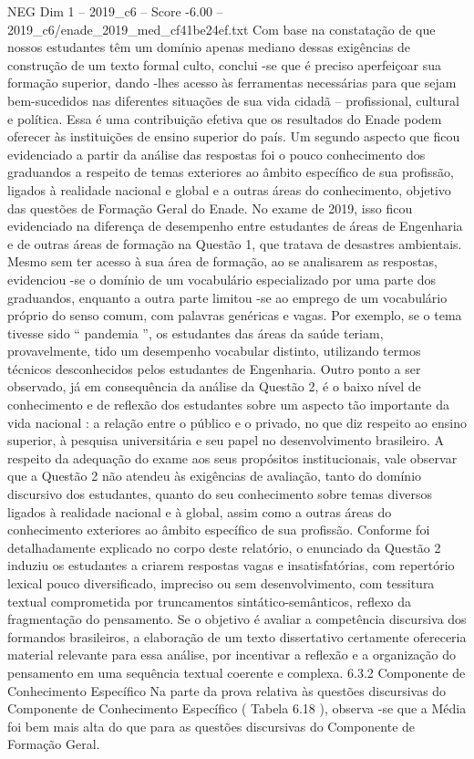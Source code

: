 \begin{textsample}{NEG Dim 1 – 2019\_c6 – Score -6.00 – 2019\_c6/enade\_2019\_med\_cf41be24ef.txt}
Com base na constatação de que nossos estudantes têm um domínio apenas mediano dessas exigências de construção de um texto formal culto, conclui -se que é preciso aperfeiçoar sua formação superior, dando -lhes acesso às ferramentas necessárias para que sejam bem-sucedidos nas diferentes situações de sua vida cidadã – profissional, cultural e política.
Essa é uma contribuição efetiva que os resultados do Enade podem oferecer às instituições de ensino superior do país.
Um segundo aspecto que ficou evidenciado a partir da análise das respostas foi o pouco conhecimento dos graduandos a respeito de temas exteriores ao âmbito específico de sua profissão, ligados à realidade nacional e global e a outras áreas do conhecimento, objetivo das questões de Formação Geral do Enade.
No exame de 2019, isso ficou evidenciado na diferença de desempenho entre estudantes de áreas de Engenharia e de outras áreas de formação na Questão 1, que tratava de desastres ambientais.
Mesmo sem ter acesso à sua área de formação, ao se analisarem as respostas, evidenciou -se o domínio de um vocabulário especializado por uma parte dos graduandos, enquanto a outra parte limitou -se ao emprego de um vocabulário próprio do senso comum, com palavras genéricas e vagas.
Por exemplo, se o tema tivesse sido “ pandemia ”, os estudantes das áreas da saúde teriam, provavelmente, tido um desempenho vocabular distinto, utilizando termos técnicos desconhecidos pelos estudantes de Engenharia.
Outro ponto a ser observado, já em consequência da análise da Questão 2, é o baixo nível de conhecimento e de reflexão dos estudantes sobre um aspecto tão importante da vida nacional : a relação entre o público e o privado, no que diz respeito ao ensino superior, à pesquisa universitária e seu papel no desenvolvimento brasileiro.
A respeito da adequação do exame aos seus propósitos institucionais, vale observar que a Questão 2 não atendeu às exigências de avaliação, tanto do domínio discursivo dos estudantes, quanto do seu conhecimento sobre temas diversos ligados à realidade nacional e à global, assim como a outras áreas do conhecimento exteriores ao âmbito específico de sua profissão.
Conforme foi detalhadamente explicado no corpo deste relatório, o enunciado da Questão 2 induziu os estudantes a criarem respostas vagas e insatisfatórias, com repertório lexical pouco diversificado, impreciso ou sem desenvolvimento, com tessitura textual comprometida por truncamentos sintático-semânticos, reflexo da fragmentação do pensamento.
Se o objetivo é avaliar a competência discursiva dos formandos brasileiros, a elaboração de um texto dissertativo certamente ofereceria material relevante para essa análise, por incentivar a reflexão e a organização do pensamento em uma sequência textual coerente e complexa. 6.3.2 Componente de Conhecimento Específico Na parte da prova relativa às questões discursivas do Componente de Conhecimento Específico ( Tabela 6.18 ), observa -se que a Média foi bem mais alta do que para as questões discursivas do Componente de Formação Geral.

\end{textsample}
